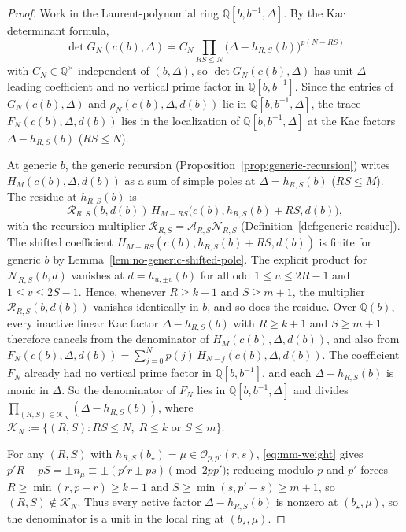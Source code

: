 \documentclass[twoside,10pt]{article}
\numberwithin{equation}{section}
\theoremstyle{slbody}
\theoremstyle{definition}
\theoremstyle{remark}
\begin{document}
\begin{proof}
Work in the Laurent-polynomial ring \(\mathbb{Q}[b,b^{-1},\Delta]\).  By the
Kac determinant formula,
\[
 \det G_N(c(b),\Delta)
 =C_N\prod_{RS\leq N}\bigl(\Delta-h_{R,S}(b)\bigr)^{p(N-RS)}
\]
with \(C_N\in\mathbb{Q}^\times\) independent of \((b,\Delta)\), so
\(\det G_N(c(b),\Delta)\) has unit \(\Delta\)-leading coefficient and no
vertical prime factor in \(\mathbb{Q}[b,b^{-1}]\).  Since the entries of
\(G_N(c(b),\Delta)\) and \(\rho_N(c(b),\Delta,d(b))\) lie in
\(\mathbb{Q}[b,b^{-1},\Delta]\), the trace \(F_N(c(b),\Delta,d(b))\) lies in
the localization of \(\mathbb{Q}[b,b^{-1},\Delta]\) at the Kac factors
\(\Delta-h_{R,S}(b)\) (\(RS\leq N\)).

At generic \(b\), the generic recursion
(Proposition~\ref{prop:generic-recursion}) writes \(H_M(c(b),\Delta,d(b))\) as a
sum of simple poles at \(\Delta=h_{R,S}(b)\) (\(RS\leq M\)).  The residue at
\(h_{R,S}(b)\) is
\[
 \mathcal{R}_{R,S}(b,d(b))\,H_{M-RS}\bigl(c(b),h_{R,S}(b)+RS,d(b)\bigr),
\]
with the recursion multiplier
\(\mathcal{R}_{R,S}=\mathcal{A}_{R,S}\mathcal{N}_{R,S}\)
(Definition~\ref{def:generic-residue}).  The shifted coefficient
\(H_{M-RS}(c(b),h_{R,S}(b)+RS,d(b))\) is finite for generic \(b\) by
Lemma~\ref{lem:no-generic-shifted-pole}.  The explicit product for
\(\mathcal{N}_{R,S}(b,d)\) vanishes at \(d=h_{u,\pm v}(b)\) for all odd
\(1\leq u\leq 2R-1\) and \(1\leq v\leq 2S-1\).  Hence, whenever \(R\geq k+1\)
and \(S\geq m+1\), the multiplier \(\mathcal{R}_{R,S}(b,d(b))\) vanishes
identically in \(b\), and so does the residue.  Over \(\mathbb{Q}(b)\), every
inactive linear Kac factor \(\Delta-h_{R,S}(b)\) with \(R\geq k+1\) and
\(S\geq m+1\) therefore cancels from the denominator of
\(H_M(c(b),\Delta,d(b))\), and also from
\(F_N(c(b),\Delta,d(b))=\sum_{j=0}^Np(j)\,H_{N-j}(c(b),\Delta,d(b))\).  The
coefficient \(F_N\) already had no vertical prime factor in
\(\mathbb{Q}[b,b^{-1}]\), and each \(\Delta-h_{R,S}(b)\) is monic in
\(\Delta\).  So the denominator of \(F_N\) lies in
\(\mathbb{Q}[b,b^{-1},\Delta]\) and divides
\(\prod_{(R,S)\in\mathcal{K}_N}(\Delta-h_{R,S}(b))\), where
\(\mathcal{K}_N:=\{(R,S):RS\leq N,\; R\leq k\text{ or }S\leq m\}\).

For any \((R,S)\) with
\(h_{R,S}(b_\star)=\mu\in\mathcal{O}_{p,p'}(r,s)\), \eqref{eq:mm-weight} gives
\(p'R-pS=\pm n_\mu\equiv\pm(p'r\pm ps)\pmod{2pp'}\); reducing modulo \(p\) and
\(p'\) forces \(R\geq\min(r,p-r)\geq k+1\) and \(S\geq\min(s,p'-s)\geq m+1\),
so \((R,S)\notin\mathcal{K}_N\).  Thus every active factor
\(\Delta-h_{R,S}(b)\) is nonzero at \((b_\star,\mu)\), so the denominator is a
unit in the local ring at \((b_\star,\mu)\).
\end{proof}
\end{document}
